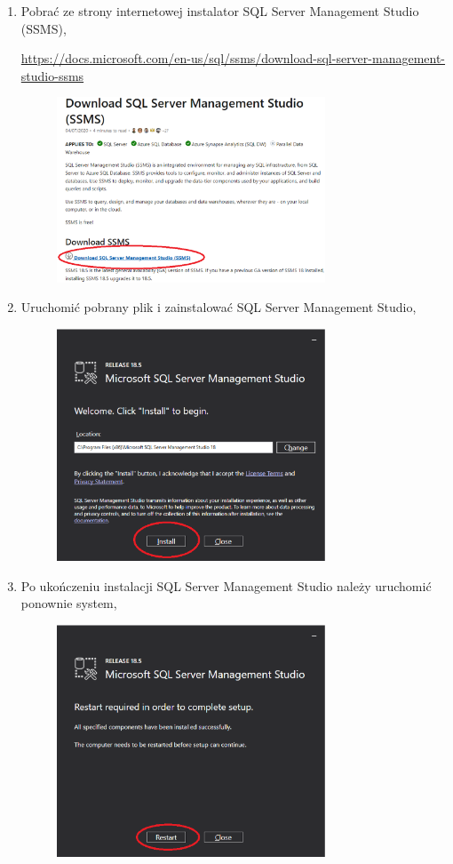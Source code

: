 \documentclass[12pt,a4paper]{article}
\begin{document}
\begin{enumerate}
				\item Pobrać ze strony internetowej instalator SQL Server Management Studio (SSMS),
					\begin{tcolorbox}[minipage,colback=white,arc=0pt,outer arc=0pt, fontupper=\footnotesize]
						\url{https://docs.microsoft.com/en-us/sql/ssms/download-sql-server-management-studio-ssms}
					\end{tcolorbox}
					\begin{figure}[H]
						\centering
						\includegraphics[width=8cm]{img/Local_Install_5.5.eps}
					\end{figure}
									
				\item Uruchomić pobrany plik i zainstalować SQL Server Management Studio,
					\begin{figure}[H]
						\centering
						\includegraphics[width=8cm]{img/Local_Install_6.eps}
					\end{figure}
					
				\item Po ukończeniu instalacji SQL Server Management Studio należy uruchomić ponownie system,
					\begin{figure}[H]
						\centering
						\includegraphics[width=8cm]{img/Local_Install_7.eps}
					\end{figure}
					

\end{enumerate}
\end{document}
